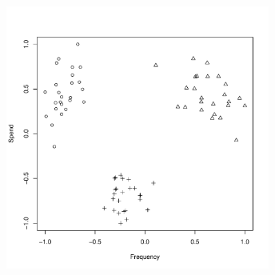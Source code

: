 \documentclass[xcolor={table}]{beamer}
\begin{document}
\begin{frame}[plain] 
\begin{center}
\includegraphics[width=0.65\textwidth]{./images/gradientDescentMultinomialLogisticClassificationDemoDataset.pdf}
\end{center}
\end{frame} 
\end{document}
